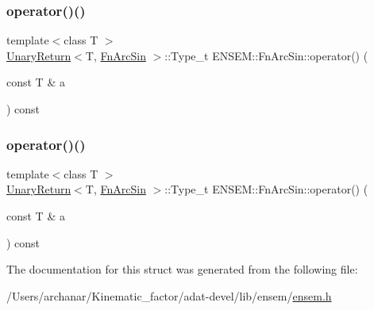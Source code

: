\mbox{\label{structENSEM_1_1FnArcSin_a2b5019522f59b30d6320947daae37df8}} 
\subsubsection{\texorpdfstring{operator()()}{operator()()}\hspace{0.1cm}{\footnotesize\ttfamily [2/3]}}
{\footnotesize\ttfamily template$<$class T $>$ \\
\mbox{\hyperlink{structENSEM_1_1UnaryReturn}{Unary\+Return}}$<$T, \mbox{\hyperlink{structENSEM_1_1FnArcSin}{Fn\+Arc\+Sin}} $>$\+::Type\+\_\+t E\+N\+S\+E\+M\+::\+Fn\+Arc\+Sin\+::operator() (\begin{DoxyParamCaption}\item[{const T \&}]{a }\end{DoxyParamCaption}) const\hspace{0.3cm}{\ttfamily [inline]}}

\mbox{\label{structENSEM_1_1FnArcSin_a2b5019522f59b30d6320947daae37df8}} 
\subsubsection{\texorpdfstring{operator()()}{operator()()}\hspace{0.1cm}{\footnotesize\ttfamily [3/3]}}
{\footnotesize\ttfamily template$<$class T $>$ \\
\mbox{\hyperlink{structENSEM_1_1UnaryReturn}{Unary\+Return}}$<$T, \mbox{\hyperlink{structENSEM_1_1FnArcSin}{Fn\+Arc\+Sin}} $>$\+::Type\+\_\+t E\+N\+S\+E\+M\+::\+Fn\+Arc\+Sin\+::operator() (\begin{DoxyParamCaption}\item[{const T \&}]{a }\end{DoxyParamCaption}) const\hspace{0.3cm}{\ttfamily [inline]}}



The documentation for this struct was generated from the following file\+:\begin{DoxyCompactItemize}
\item 
/\+Users/archanar/\+Kinematic\+\_\+factor/adat-\/devel/lib/ensem/\mbox{\hyperlink{adat-devel_2lib_2ensem_2ensem_8h}{ensem.\+h}}\end{DoxyCompactItemize}
